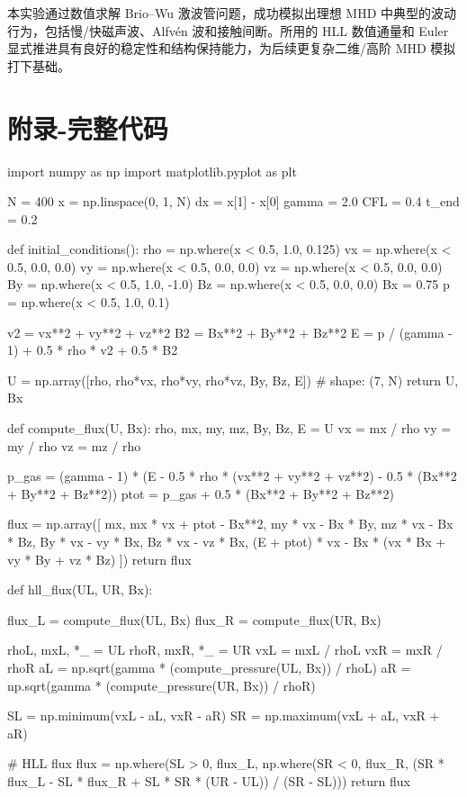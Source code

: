 \documentclass[12pt]{article}
\begin{document}
本实验通过数值求解 Brio–Wu 激波管问题，成功模拟出理想 MHD 中典型的波动行为，包括慢/快磁声波、Alfvén 波和接触间断。所用的 HLL 数值通量和 Euler 显式推进具有良好的稳定性和结构保持能力，为后续更复杂二维/高阶 MHD 模拟打下基础。

\section{附录-完整代码}
\begin{python}
    import numpy as np
import matplotlib.pyplot as plt

N = 400                  
x = np.linspace(0, 1, N) 
dx = x[1] - x[0]
gamma = 2.0              
CFL = 0.4
t_end = 0.2

def initial_conditions():
    rho = np.where(x < 0.5, 1.0, 0.125)
    vx  = np.where(x < 0.5, 0.0, 0.0)
    vy  = np.where(x < 0.5, 0.0, 0.0)
    vz  = np.where(x < 0.5, 0.0, 0.0)
    By  = np.where(x < 0.5, 1.0, -1.0)
    Bz  = np.where(x < 0.5, 0.0, 0.0)
    Bx  = 0.75
    p   = np.where(x < 0.5, 1.0, 0.1)

    v2 = vx**2 + vy**2 + vz**2
    B2 = Bx**2 + By**2 + Bz**2
    E = p / (gamma - 1) + 0.5 * rho * v2 + 0.5 * B2

    U = np.array([rho, rho*vx, rho*vy, rho*vz, By, Bz, E])  # shape: (7, N)
    return U, Bx

def compute_flux(U, Bx):
    rho, mx, my, mz, By, Bz, E = U
    vx = mx / rho
    vy = my / rho
    vz = mz / rho

    p_gas = (gamma - 1) * (E - 0.5 * rho * (vx**2 + vy**2 + vz**2) - 0.5 * (Bx**2 + By**2 + Bz**2))
    ptot = p_gas + 0.5 * (Bx**2 + By**2 + Bz**2)


    flux = np.array([
        mx,
        mx * vx + ptot - Bx**2,
        my * vx - Bx * By,
        mz * vx - Bx * Bz,
        By * vx - vy * Bx,
        Bz * vx - vz * Bx,
        (E + ptot) * vx - Bx * (vx * Bx + vy * By + vz * Bz)
    ])
    return flux

def hll_flux(UL, UR, Bx):

    flux_L = compute_flux(UL, Bx)
    flux_R = compute_flux(UR, Bx)

    rhoL, mxL, *_ = UL
    rhoR, mxR, *_ = UR
    vxL = mxL / rhoL
    vxR = mxR / rhoR
    aL = np.sqrt(gamma * (compute_pressure(UL, Bx)) / rhoL)
    aR = np.sqrt(gamma * (compute_pressure(UR, Bx)) / rhoR)

    SL = np.minimum(vxL - aL, vxR - aR)
    SR = np.maximum(vxL + aL, vxR + aR)

    # HLL flux
    flux = np.where(SL > 0, flux_L, np.where(SR < 0, flux_R, (SR * flux_L - SL * flux_R + SL * SR * (UR - UL)) / (SR - SL)))
    return flux


\end{python}
\end{document}
